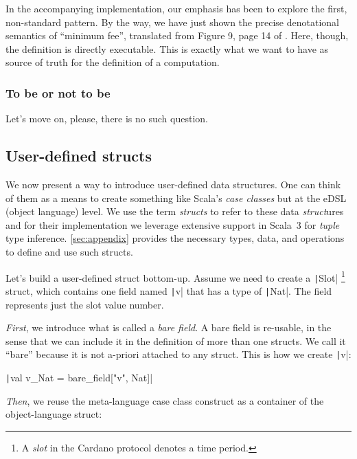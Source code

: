 \documentclass[11pt]{article}
\newcommand{\ScalaI}[1]{\texttt|#1|}
\newcommand{\OneTwoThreeX}[1]{\marginpar{\faCubes{ \smaller #1}}\xspace}
\newcommand{\OneTwoThree}{\OneTwoThreeX{}}
\newcommand{\FirstEtcX}[1]{\marginpar{\faCube{ \smaller #1}}\xspace}
\newcommand{\FirstEtc}{\FirstEtcX{}}
\begin{document}
\noindent In the accompanying implementation, our emphasis has been to 
explore the first, non-standard pattern. By the way, we have just shown the 
precise denotational semantics of ``minimum fee'', translated from Figure 9, 
page 14 of \cite{cardano:ledger-spec:shelley:2019}. Here, though, the 
definition is directly executable. This is exactly what we want to have as 
source of truth for the definition of a computation.

\subsubsection{To be or not to be}
Let's move on, please, there is no such question.

\subsection{User-defined structs}

We now present a way to introduce user-defined data structures. One can think 
of them as a means to create something like Scala's \textit{case classes} but 
at the eDSL (object language) level. We use the term \textit{structs} to 
refer to these data \textit{struct}ures and for their implementation we 
leverage extensive support in Scala~3 for \textit{tuple} type inference. 
\autoref{sec:appendix} provides the necessary types, data, and operations to 
define and use such structs.

Let's build a user-defined struct bottom-up\OneTwoThree. Assume we need to 
create a \ScalaI{Slot}%
\footnote{A \textit{slot} in the Cardano protocol denotes a time period.}%
 struct, which contains one field named \ScalaI{v} that has a type of 
 \ScalaI{Nat}. The field represents just the slot value number.

\textit{First}\FirstEtc, we introduce what is called a \textit{bare field}. A 
bare field is re-usable, in the sense that we can include it in the 
definition of more than one structs. We call it ``bare'' because it is not 
a-priori attached to any struct. This is how we create \ScalaI{v}:

\ScalaI{val v_Nat = bare_field["v", Nat]}

\textit{Then}\FirstEtc, we reuse the meta-language case class construct as a 
container of the object-language struct:
\end{document}
